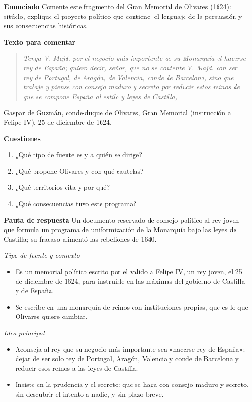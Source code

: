 \documentclass{book}
\begin{document}
\begin{tcolorbox}[title={Ejercicio resuelto}, studiumworked, breakable]

\noindent\textbf{Enunciado}
Comente este fragmento del Gran Memorial de Olivares (1624): sitúelo, explique el proyecto político que contiene, el lenguaje de la persuasión y sus consecuencias históricas.


\noindent\textbf{Texto para comentar}

\begin{quote}
\itshape Tenga V. Majd. por el negocio más importante de su Monarquía el hacerse rey de España; quiero decir, señor, que no se contente V. Majd. con ser rey de Portugal, de Aragón, de Valencia, conde de Barcelona, sino que trabaje y piense con consejo maduro y secreto por reducir estos reinos de que se compone España al estilo y leyes de Castilla,
\end{quote}
{\noindent\footnotesize Gaspar de Guzmán, conde-duque de Olivares, Gran Memorial (instrucción a Felipe IV), 25 de diciembre de 1624.\par}

\noindent\textbf{Cuestiones}
\begin{enumerate}
\item ¿Qué tipo de fuente es y a quién se dirige?
\item ¿Qué propone Olivares y con qué cautelas?
\item ¿Qué territorios cita y por qué?
\item ¿Qué consecuencias tuvo este programa?
\end{enumerate}

\noindent\textbf{Pauta de respuesta}
Un documento reservado de consejo político al rey joven que formula un programa de uniformización de la Monarquía bajo las leyes de Castilla; su fracaso alimentó las rebeliones de 1640.


\noindent\textit{Tipo de fuente y contexto}
\begin{itemize}
\item Es un memorial político escrito por el valido a Felipe IV, un rey joven, el 25 de diciembre de 1624, para instruirle en las máximas del gobierno de Castilla y de España.
\item Se escribe en una monarquía de reinos con instituciones propias, que es lo que Olivares quiere cambiar.
\end{itemize}

\noindent\textit{Idea principal}
\begin{itemize}
\item Aconseja al rey que su negocio más importante sea «hacerse rey de España»: dejar de ser solo rey de Portugal, Aragón, Valencia y conde de Barcelona y reducir esos reinos a las leyes de Castilla.
\item Insiste en la prudencia y el secreto: que se haga con consejo maduro y secreto, sin descubrir el intento a nadie, y sin plazo breve.
\end{itemize}


\end{tcolorbox}
\end{document}
